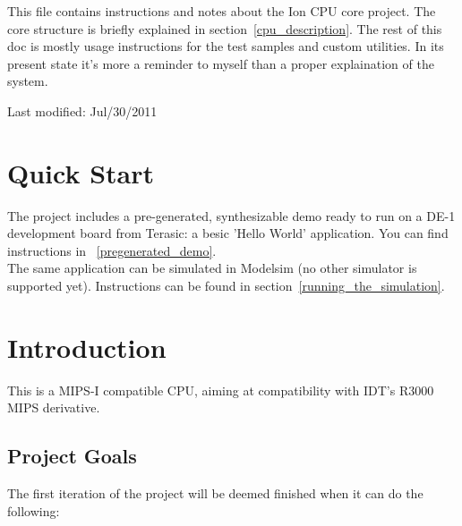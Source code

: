 \documentclass[11pt]{article}
\begin{document}
         


This file contains instructions and notes about the Ion CPU core project.
The core structure is briefly explained in section~\ref{cpu_description}. The rest of this doc is 
mostly usage instructions for the test samples and custom utilities.
In its present state it's more a reminder to myself than a proper explaination 
of the system.

Last modified: Jul/30/2011


\section{Quick Start}
\label{quick_start}

    The project includes a pre-generated, synthesizable demo ready to run on a 
    DE-1 development board from Terasic: a besic 'Hello World' application. 
    You can find instructions in ~\ref{pregenerated_demo}.\\
    
    The same application can be simulated in Modelsim (no other simulator is 
    supported yet). Instructions can be found in section~\ref{running_the_simulation}.


\section{Introduction}
\label{intro}

    This is a MIPS-I compatible CPU, aiming at compatibility with IDT's R3000 
    MIPS derivative.\\

\subsection{Project Goals}
\label{goals}

    The first iteration of the project will be deemed finished when it can do
    the following:
\end{document}
